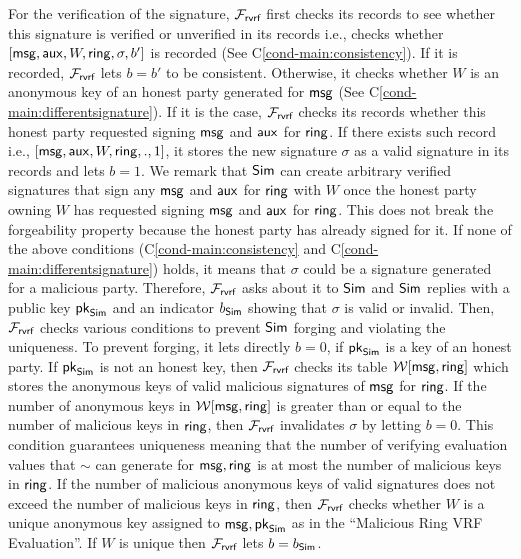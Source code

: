 For the verification of the signature, $ \mathcal{F}_{\textsf{rvrf}} $  first checks its records to see whether this signature is verified or unverified in its records i.e., checks  whether $ [\mathsf{msg},\mathsf{aux},W,\mathsf{ring},\sigma, b'] $ is recorded (See  C\ref{cond-main:consistency}). If it is recorded, $ \mathcal{F}_{\textsf{rvrf}} $ lets  $ b = b' $ to be consistent. Otherwise, it checks whether $ W $ is an anonymous key of an honest party generated for $ \mathsf{msg} $ (See C\ref{cond-main:differentsignature}). If it is the case, $ \mathcal{F}_{\textsf{rvrf}} $ checks  its records whether this honest party requested signing  $ \mathsf{msg} $ and $ \mathsf{aux} $ for $ \mathsf{ring} $.  If there exists such record i.e., $ [\mathsf{msg}, \mathsf{aux}, W, \mathsf{ring}, ., 1] $, it stores the new signature $ \sigma $ as a valid signature in its records and lets $ b = 1 $. We remark that $ \mathsf{Sim} $ can create arbitrary verified signatures that sign any $ \mathsf{msg} $ and $ \mathsf{aux} $ for $ \mathsf{ring} $ with $ W $ once the honest party owning $ W $ has requested signing $ \mathsf{msg} $ and $ \mathsf{aux} $ for $ \mathsf{ring} $. This does not break the forgeability property because the honest party has already signed for it. 
If none of the above conditions (C\ref{cond-main:consistency} and C\ref{cond-main:differentsignature}) holds, it means that $ \sigma $ could be a signature generated for a malicious party. Therefore, $ \mathcal{F}_{\textsf{rvrf}} $ asks about it to $ \mathsf{Sim} $ and $ \mathsf{Sim} $ replies with  a public key $ \mathsf{pk}_{\mathsf{Sim}} $ and an indicator $ b_{\mathsf{Sim}} $ showing that $ \sigma  $ is valid or invalid. Then, $ \mathcal{F}_{\textsf{rvrf}} $ checks various conditions to prevent $ \mathsf{Sim} $ forging and violating the uniqueness. To prevent forging, it lets  directly $ b = 0 $, if $ \mathsf{pk}_{\mathsf{Sim}} $ is a key of an honest party. If $ \mathsf{pk}_{\mathsf{Sim}} $ is not an honest key, then $ \mathcal{F}_{\textsf{rvrf}} $ checks its table $ \mathcal{W}[\mathsf{msg},\mathsf{ring}] $ which stores the anonymous keys of valid malicious signatures of $ \mathsf{msg} $ for $ \mathsf{ring} $. If the number of anonymous keys in $ \mathcal{W}[\mathsf{msg},\mathsf{ring}] $ is greater than or equal to the number of malicious keys in $ \mathsf{ring} $, then $ \mathcal{F}_{\textsf{rvrf}} $ invalidates $ \sigma $ by letting $ b = 0 $. This condition guarantees  uniqueness meaning that the number of verifying evaluation values that $ \sim $ can generate for $ \mathsf{msg}, \mathsf{ring} $ is at most the  number of malicious keys in $ \mathsf{ring} $. If the number of malicious anonymous keys of valid signatures does not exceed the number of malicious keys in $ \mathsf{ring} $, then $ \mathcal{F}_{\textsf{rvrf}} $ checks whether $ W $ is a unique anonymous key assigned to $ \mathsf{msg},\mathsf{pk}_{\mathsf{Sim}} $ as in the ``Malicious Ring VRF Evaluation''. If $ W $ is unique then $ \mathcal{F}_{\textsf{rvrf}} $ lets $ b = b_{\mathsf{Sim}} $.

